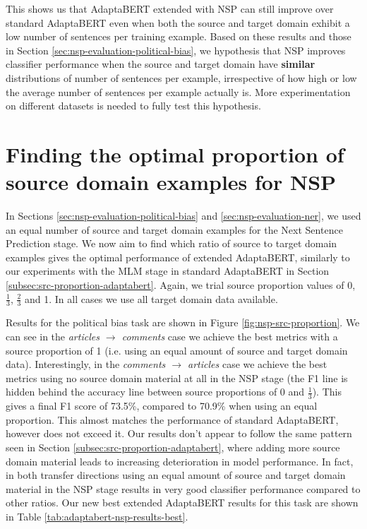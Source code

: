 This shows us that AdaptaBERT extended with NSP can still improve over standard AdaptaBERT even when both the source and target domain exhibit a low number of sentences per training example. Based on these results and those in Section \ref{sec:nsp-evaluation-political-bias}, we hypothesis that NSP improves classifier performance when the source and target domain have \textbf{similar} distributions of number of sentences per example, irrespective of how high or low the average number of sentences per example actually is. More experimentation on different datasets is needed to fully test this hypothesis.

\section{Finding the optimal proportion of source domain examples for NSP}

In Sections \ref{sec:nsp-evaluation-political-bias} and \ref{sec:nsp-evaluation-ner}, we used an equal number of source and target domain examples for the Next Sentence Prediction stage. We now aim to find which ratio of source to target domain examples gives the optimal performance of extended AdaptaBERT, similarly to our experiments with the MLM stage in standard AdaptaBERT in Section \ref{subsec:src-proportion-adaptabert}. Again, we trial source proportion values of 0, $ \frac{1}{3} $, $ \frac{2}{3} $ and 1. In all cases we use all target domain data available.

Results for the political bias task are shown in Figure \ref{fig:nsp-src-proportion}. We can see in the \textit{articles $ \rightarrow $ comments} case we achieve the best metrics with a source proportion of 1 (i.e. using an equal amount of source and target domain data). Interestingly, in the \textit{comments $ \rightarrow $ articles} case we achieve the best metrics using no source domain material at all in the NSP stage (the F1 line is hidden behind the accuracy line between source proportions of 0 and $ \frac{1}{3} $). This gives a final F1 score of 73.5\%, compared to 70.9\% when using an equal proportion. This almost matches the performance of standard AdaptaBERT, however does not exceed it. Our results don't appear to follow the same pattern seen in Section \ref{subsec:src-proportion-adaptabert}, where adding more source domain material leads to increasing deterioration in model performance. In fact, in both transfer directions using an equal amount of source and target domain material in the NSP stage results in very good classifier performance compared to other ratios. Our new best extended AdaptaBERT results for this task are shown in Table \ref{tab:adaptabert-nsp-results-best}. 


